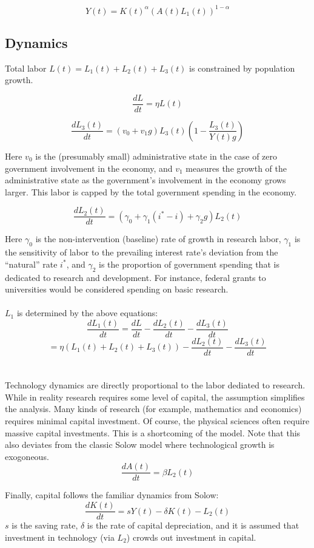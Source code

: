 \documentclass[12pt]{article}
\theoremstyle{definition}
\begin{document}
\[Y(t)=K(t)^\alpha (A(t)L_1(t))^{1-\alpha}\]

\subsection{Dynamics}

Total labor \(L(t)=L_1(t)+L_2(t)+L_3(t)\) is constrained by population growth.

\[\frac{dL}{dt}=\eta L(t)\]

\[\frac{dL_3(t)}{dt}=\left(v_0+v_1g\right)L_3(t)\left(1-\frac{L_3(t)}{Y(t)g}\right) \]

Here \(v_0\) is the (presumably small) administrative state in the case of zero government involvement in the economy, and \(v_1\) measures the growth of the administrative state as the government's involvement in the economy grows larger.  This labor is capped by the total government spending in the economy.

\[\frac{dL_2(t)}{dt}=\left(\gamma_0+\gamma_1 (i^*-i) +\gamma_2 g\right) L_2(t) \]

Here \(\gamma_0\) is the non-intervention (baseline) rate of growth in research labor, \(\gamma_1\) is the sensitivity of labor to the prevailing interest rate's deviation from the ``natural'' rate \(i^*\), and \(\gamma_2\) is the proportion of government spending that is dedicated to research and development.  For instance, federal grants to universities would be considered spending on basic research.   
\\
\\
\(L_1\) is determined by the above equations:
\[\frac{dL_1(t)}{dt}=\frac{dL}{dt}-\frac{dL_2(t)}{dt}-\frac{dL_3(t)}{dt}\] 
\[=\eta\left(L_1(t)+L_2(t)+L_3(t)\right)-\frac{dL_2(t)}{dt}-\frac{dL_3(t)}{dt}\]
\\
\\
Technology dynamics are directly proportional to the labor dediated to research.  While in reality research requires some level of capital, the assumption simplifies the analysis.  Many kinds of research (for example, mathematics and economics) requires minimal capital investment.  Of course, the physical sciences often require massive capital investments.  This is a shortcoming of the model.  Note that this also deviates from the classic Solow model where technological growth is exogoneous.
\[\frac{dA(t)}{dt}=\beta L_2(t)\]

Finally, capital follows the familiar dynamics from Solow:
\[\frac{dK(t)}{dt}=s Y(t) - \delta K(t)- L_2(t)\]
\(s\) is the saving rate, \(\delta\) is the rate of capital depreciation, and it is assumed that investment in technology (via \(L_2\)) crowds out investment in capital.  
\end{document}
